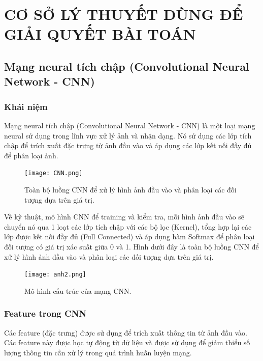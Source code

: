 
\chapter{CƠ SỞ LÝ THUYẾT DÙNG ĐỂ GIẢI QUYẾT BÀI TOÁN} 

\label{Chapter2}

\section{Mạng neural tích chập (Convolutional Neural Network - CNN)}

\subsection{Khái niệm}

Mạng neural tích chập (Convolutional Neural Network - CNN) là một loại mạng neural sử dụng trong lĩnh vực xử lý ảnh và nhận dạng. Nó sử dụng các lớp tích chập để trích xuất đặc trưng từ ảnh đầu vào và áp dụng các lớp kết nối đầy đủ để phân loại ảnh. 

\begin{figure}[h!]
	\centering
	\texttt{[image: CNN.png]}
	\caption[Toàn bộ luồng CNN để xử lý hình ảnh đầu vào và phân loại các đối tượng dựa trên giá trị.]{Toàn bộ luồng CNN để xử lý hình ảnh đầu vào và phân loại các đối tượng dựa trên giá trị.}
	\label{fig:CNN} 
\end{figure}

Về kỹ thuật, mô hình CNN để training và kiểm tra, mỗi hình ảnh đầu vào sẽ chuyển nó qua 1 loạt các lớp tích chập với các bộ lọc (Kernel), tổng hợp lại các lớp được kết nối đầy đủ (Full Connected) và áp dụng hàm Softmax để phân loại đối tượng có giá trị xác suất giữa 0 và 1. Hình dưới đây là toàn bộ luồng CNN để xử lý hình ảnh đầu vào và phân loại các đối tượng dựa trên giá trị.

\begin{figure}[h!]
	\centering
	\texttt{[image: anh2.png]}
	\caption[Mô hình cấu trúc của mạng CNN.]{Mô hình cấu trúc của mạng CNN.}
	\label{fig:anh2} 
\end{figure}

\subsection{Feature trong CNN}

Các feature (đặc trưng) được sử dụng để trích xuất thông tin từ ảnh đầu vào. Các feature này được học tự động từ dữ liệu và được sử dụng để giảm thiểu số lượng thông tin cần xử lý trong quá trình huấn luyện mạng. 

